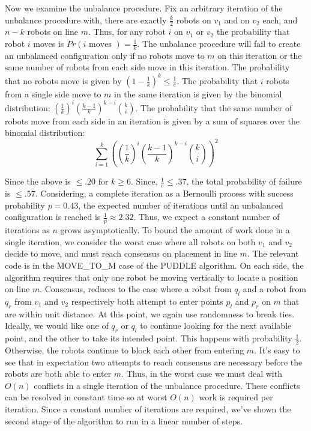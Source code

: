 \documentclass[preprint,10pt]{elsarticle}
\begin{document}
		Now we examine the unbalance procedure. Fix an arbitrary iteration of the unbalance procedure with,
		there are exactly $\frac{k}{2}$ robots on $v_1$ and on $v_2$ each, and $n - k$ robots on line $m$. 
		Thus, for any robot $i$ on $v_1$ or $v_2$ the probability that robot $i$ moves is 
		$Pr(i \text{ moves }) = \frac{1}{k}$. The unbalance procedure will fail to create an unbalanced configuration
		only if no robots move to $m$ on this iteration or the same number of robots from each side move
		in this iteration. %
		The probability that no robots move is given by $(1 - \frac{1}{k})^{k} \leq \frac{1}{e}$. 
		The probability that $i$ robots from a single side move to $m$ in the same iteration is given 
		by the binomial distribution: $(\frac{1}{k})^i (\frac{k-1}{k})^{k-i} {k\choose i}$.
		The probability that the same number of robots move from each side in an iteration is given 
		by a sum of squares over the binomial distribution:
		$$\sum_{i=1}^{k}{((\frac{1}{k})^i (\frac{k-1}{k})^{k-i} {k\choose i})^2} \label{eq1}$$

		Since the above is $\leq  .20 \text{ for } 
		k \geq 6$. Since, $\frac{1}{e} \leq .37$, the total probability of failure is $\leq .57$. Considering, a complete
		iteration as a Bernoulli process with success probability $p = 0.43$, the expected number of iterations until 
		an unbalanced configuration is reached is $\frac{1}{p} \approx 2.32$. Thus, we expect a constant number of iterations
		as $n$ grows asymptotically. To bound the amount of work done in a single iteration, we consider the worst case
		where all robots on both $v_1$ and $v_2$ decide to move, and must reach consensus on placement in line $m$. 
		The relevant code is in the MOVE\_TO\_M case of the PUDDLE algorithm. On each side, the algorithm requires that only 
		one robot be moving vertically to locate a position on line $m$. Consensus, reduces to the case where a robot
		from $q_l$ and a robot from $q_r$ from $v_1$ and $v_2$ respectively both attempt to enter 
		points $p_l$ and $p_r$ on $m$ that are within unit distance. At this point, we again use randomness
		to break ties. Ideally, we would like one of $q_r$ or $q_l$ to continue looking for the next available point,
		and the other to take its intended point. This happens with probability $\frac{1}{2}$. Otherwise, the robots 
		continue to block each other from entering $m$. It's easy to see that in expectation two attempts to reach
		consensus are necessary before the robots are both able to enter $m$. Thus, in the worst case we must deal with
		$O(n)$ conflicts in a single iteration of the unbalance procedure. These conflicts can be resolved in 
		constant time so at worst $O(n)$ work is required per iteration. Since a constant number of iterations are 
		required, we've shown the second stage of the algorithm to run in a linear number of steps. \\
\end{document}
